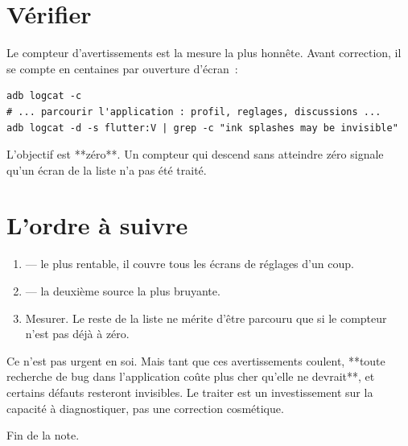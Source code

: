 \documentclass[11pt,a4paper,oneside]{report}
\begin{document}
\section{Vérifier}

Le compteur d'avertissements est la mesure la plus honnête. Avant correction, il
se compte en centaines par ouverture d'écran~:

\begin{lstlisting}[style=Alanya, language={}]
adb logcat -c
# ... parcourir l'application : profil, reglages, discussions ...
adb logcat -d -s flutter:V | grep -c "ink splashes may be invisible"
\end{lstlisting}

L'objectif est **zéro**. Un compteur qui descend sans atteindre zéro signale
qu'un écran de la liste n'a pas été traité.

\section{L'ordre à suivre}

\begin{enumerate}[leftmargin=*]
  \item {} --- le plus rentable, il couvre tous les
        écrans de réglages d'un coup.
  \item {} --- la deuxième source la plus bruyante.
  \item Mesurer. Le reste de la liste ne mérite d'être parcouru que si le
        compteur n'est pas déjà à zéro.
\end{enumerate}

\begin{alerte}
Ce n'est pas urgent en soi. Mais tant que ces avertissements coulent, **toute
recherche de bug dans l'application coûte plus cher qu'elle ne devrait**, et
certains défauts resteront invisibles. Le traiter est un investissement sur la
capacité à diagnostiquer, pas une correction cosmétique.
\end{alerte}

\vfill
\begin{center}\small\color{AlanyaGray}\sffamily
Fin de la note.
\end{center}
\end{document}

